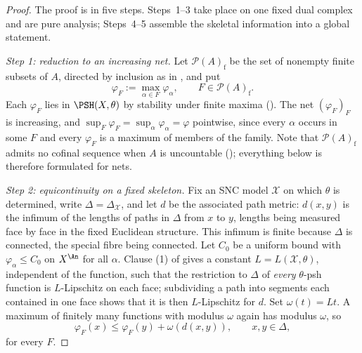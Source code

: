 \begin{proof}
The proof is in five steps.  Steps~1--3 take place on one fixed dual
complex and are pure analysis; Steps~4--5 assemble the skeletal information
into a global statement.

\emph{Step 1: reduction to an increasing net.}  Let \(\mathcal P(A)_{\mathrm
f}\) be the set of nonempty finite subsets of \(A\), directed by inclusion
as in , and put
\begin{equation}\label{eq:ch23-finite-maxima}
                  \varphi_F:=\max_{\alpha\in F}\varphi_\alpha,
                  \qquad F\in\mathcal P(A)_{\mathrm f}.
\end{equation}
Each \(\varphi_F\) lies in \(\PSH(X,\theta)\) by stability under finite
maxima ().  The net
\((\varphi_F)_F\) is increasing, and
\(\sup_F\varphi_F=\sup_\alpha\varphi_\alpha=\varphi\) pointwise, since every
\(\alpha\) occurs in some \(F\) and every \(\varphi_F\) is a maximum of
members of the family.  Note that \(\mathcal P(A)_{\mathrm f}\) admits no
cofinal sequence when \(A\) is uncountable
(); everything below is therefore formulated
for nets.

\emph{Step 2: equicontinuity on a fixed skeleton.}  Fix an SNC model
\(\mathcal X\) on which \(\theta\) is determined, write
\(\Delta=\Delta_{\mathcal X}\), and let \(d\) be the associated path metric:
\(d(x,y)\) is the infimum of the lengths of paths in \(\Delta\) from \(x\) to
\(y\), lengths being measured face by face in the fixed Euclidean structure.
This infimum is finite because \(\Delta\) is connected, the special fibre
being connected.  Let \(C_0\) be a uniform bound with
\(\varphi_\alpha\leq C_0\) on \(X^{\An}\) for all \(\alpha\).  Clause (1) of
 gives a constant
\(L=L(\mathcal X,\theta)\), independent of the function, such that the
restriction to \(\Delta\) of \emph{every} \(\theta\)-psh function is
\(L\)-Lipschitz on each face; subdividing a path into segments each
contained in one face shows that it is then \(L\)-Lipschitz for \(d\).  Set
\(\omega(t)=Lt\).  A maximum of finitely many functions with modulus
\(\omega\) again has modulus \(\omega\), so
\begin{equation}\label{eq:ch23-common-modulus}
 \varphi_F(x)\leq\varphi_F(y)+\omega(d(x,y)),
 \qquad x,y\in\Delta,
\end{equation}
for every \(F\).


\end{proof}
